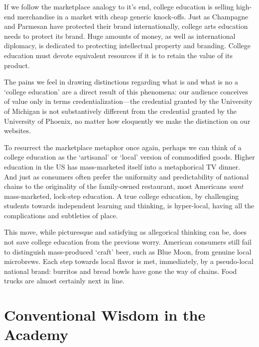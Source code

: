If we follow the marketplace analogy to it's end, college education is selling high-end merchandise in a market with cheap generic knock-offs. Just as Champagne and Parmesan have protected their brand internationally, college arts education needs to protect its brand. Huge amounts of money, as well as international diplomacy, is dedicated to protecting intellectual property and branding. College education must devote equivalent resources if it is to retain the value of its product.

The pains we feel in drawing distinctions regarding what is and what is no a `college education' are a direct result of this phenomena: our audience conceives of value only in terms credentialization---the credential granted by the University of Michigan is not substantively different from the credential granted by the University of Phoenix, no matter how eloquently we make the distinction on our websites.

To resurrect the marketplace metaphor once again, perhaps we can think of a college education as the `artisanal' or `local' version of commodified goods. Higher education in the US has mass-marketed itself into a metaphorical TV dinner. And just as consumers often prefer the uniformity and predictability of national chains to the originality of the family-owned restaurant, most Americans \emph{want} mass-marketed, lock-step education. A true college education, by challenging students towards independent learning and thinking, is hyper-local, having all the complications and subtleties of place.

This move, while picturesque and satisfying as allegorical thinking can be, does not save college education from the previous worry. American consumers still fail to distinguish mass-produced `craft' beer, such as Blue Moon, from genuine local microbrews. Each step towards local flavor is met, immediately, by a pseudo-local national brand: burritos and bread bowls have gone the way of chains. Food trucks are almost certainly next in line.

\section{Conventional Wisdom in the Academy}
\label{conventionalwisdomintheacademy}

